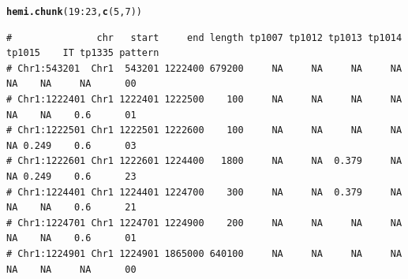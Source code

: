 \documentclass{article}\usepackage[]{graphicx}\usepackage[]{color}
\makeatletter
\newcommand{\hlnum}[1]{\textcolor[rgb]{0.686,0.059,0.569}{#1}}%
\newcommand{\hlopt}[1]{\textcolor[rgb]{0,0,0}{#1}}%
\newcommand{\hlstd}[1]{\textcolor[rgb]{0.345,0.345,0.345}{#1}}%
\newcommand{\hlkwd}[1]{\textcolor[rgb]{0.737,0.353,0.396}{\textbf{#1}}}%
\newenvironment{kframe}{%
 \def\at@end@of@kframe{}%
 \ifinner\ifhmode%
  \def\at@end@of@kframe{\end{minipage}}%
  \begin{minipage}{\columnwidth}%
 \fi\fi%
 \def\FrameCommand##1{\hskip\@totalleftmargin \hskip-\fboxsep
 \colorbox{shadecolor}{##1}\hskip-\fboxsep
     \hskip-\linewidth \hskip-\@totalleftmargin \hskip\columnwidth}%
 \MakeFramed {\advance\hsize-\width
   \@totalleftmargin\z@ \linewidth\hsize
   \@setminipage}}%
 {\par\unskip\endMakeFramed%
 \at@end@of@kframe}
\newenvironment{knitrout}{}{} %
\makeatother
\begin{document}
\begin{knitrout}\footnotesize
{}\color{fgcolor}\begin{kframe}
\begin{alltt}
\hlkwd{hemi.chunk}\hlstd{(}\hlnum{19}\hlopt{:}\hlnum{23}\hlstd{,}\hlkwd{c}\hlstd{(}\hlnum{5}\hlstd{,}\hlnum{7}\hlstd{))}
\end{alltt}
\begin{verbatim}
#               chr   start     end length tp1007 tp1012 tp1013 tp1014 tp1015    IT tp1335 pattern
# Chr1:543201  Chr1  543201 1222400 679200     NA     NA     NA     NA     NA    NA     NA      00
# Chr1:1222401 Chr1 1222401 1222500    100     NA     NA     NA     NA     NA    NA    0.6      01
# Chr1:1222501 Chr1 1222501 1222600    100     NA     NA     NA     NA     NA 0.249    0.6      03
# Chr1:1222601 Chr1 1222601 1224400   1800     NA     NA  0.379     NA     NA 0.249    0.6      23
# Chr1:1224401 Chr1 1224401 1224700    300     NA     NA  0.379     NA     NA    NA    0.6      21
# Chr1:1224701 Chr1 1224701 1224900    200     NA     NA     NA     NA     NA    NA    0.6      01
# Chr1:1224901 Chr1 1224901 1865000 640100     NA     NA     NA     NA     NA    NA     NA      00
\end{verbatim}
\end{kframe}


\end{knitrout}
\end{document}
